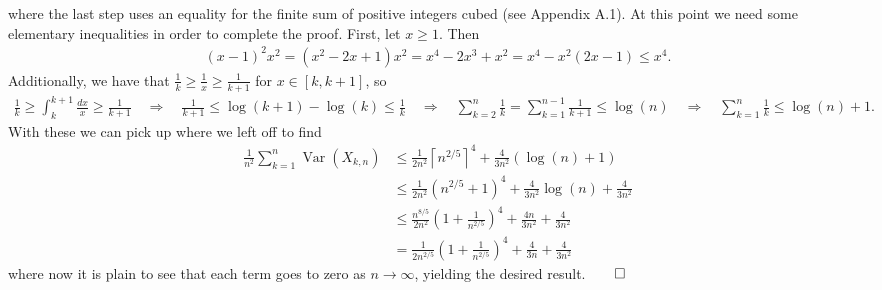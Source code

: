 \documentclass[10pt]{article}
\newcommand{\bp}[1]{\left({#1}\right)}
\newcommand{\1}[1]{\mathbbm{1}_{#1}}
\newcommand*{\ceil}[1]{\left\lceil#1\right\rceil}
\DeclareMathOperator{\Var}{Var}
\begin{document}
    where the last step uses an equality for the finite sum of positive integers cubed (see Appendix A.1). At this point we need some elementary inequalities in order to complete the proof. First, let $x\geq1$. Then
    \begin{align*}
        (x-1)^2x^2=(x^2-2x+1)x^2=x^4-2x^3+x^2=x^4-x^2(2x-1)\leq x^4.\tag{20}
    \end{align*}
    Additionally, we have that $\tfrac{1}{k}\geq\tfrac{1}{x}\geq\tfrac{1}{k+1}$ for $x\in[k,k+1]$, so
    \begin{align*}
        \frac{1}{k}\geq\int_{k}^{k+1}\frac{dx}{x}\geq\frac{1}{k+1}\quad\Rightarrow\quad\frac{1}{k+1}\leq\log(k+1)-\log(k)\leq\frac{1}{k}\quad\Rightarrow\quad\sum_{k=2}^n\frac{1}{k}=\sum_{k=1}^{n-1}\frac{1}{k+1}\leq\log(n)\quad\Rightarrow\quad \sum_{k=1}^n\frac{1}{k}\leq\log(n)+1.\tag{21}
    \end{align*}
    With these we can pick up where we left off to find
    \begin{align*}
        \frac{1}{n^2}\sum_{k=1}^n\Var(X_{k,n})&\leq \frac{1}{2n^2}\ceil{n^{2/5}}^4+\frac{4}{3n^2}(\log(n)+1)\tag{by (20) and (21)}\\
        &\leq \frac{1}{2n^2}(n^{2/5}+1)^4+\frac{4}{3n^2}\log(n)+\frac{4}{3n^2}\\
        &\leq \frac{n^{8/5}}{2n^2}\bp{1+\frac{1}{n^{2/5}}}^4+\frac{4n}{3n^2}+\frac{4}{3n^2}\tag{$\log(n)\leq n$}\\
        &=\frac{1}{2n^{2/5}}\bp{1+\frac{1}{n^{2/5}}}^4+\frac{4}{3n}+\frac{4}{3n^2}
    \end{align*}
    where now it is plain to see that each term goes to zero as $n\rightarrow\infty$, yielding the desired result.\hfill{$\qed$}\\[5pt]
\end{document}
